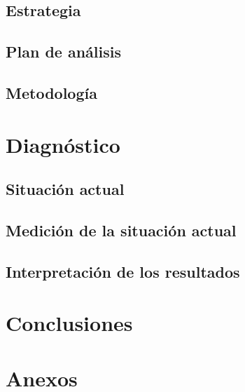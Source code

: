 \documentclass[stu,12pt,letterpaper,a4paper,donotrepeattitle]{apa7}
\begin{document}
\subsection{Estrategia}
\subsection{Plan de an\'alisis}
\subsection{Metodolog\'ia}

\newpage

\section{Diagn\'ostico}
\subsection{Situaci\'on actual}
\subsection{Medici\'on de la situaci\'on actual}
\subsection{Interpretaci\'on de los resultados}

\newpage

\section{Conclusiones}

\newpage

\nocite{*}



\newpage

\section{Anexos}
\end{document}
